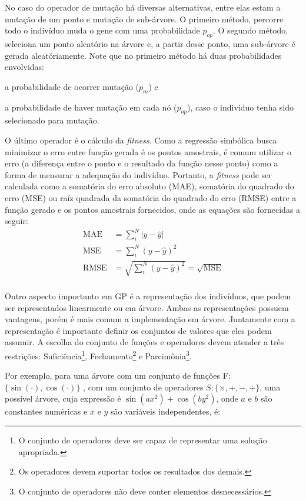 \documentclass[a4paper]{paper}
\begin{document}
No caso do operador de mutação há diversas alternativas, entre elas estam a
mutação de um ponto e mutação de sub-árvore. O primeiro método, percorre todo o
indivíduo muda o gene com uma probabilidade $p_{op}$. O segundo método, seleciona
um ponto aleatório na árvore e, a partir desse ponto, uma sub-árvore é gerada
aleatóriamente. Note que no primeiro método há duas probabilidades envolvidas:
\begin{ilist}
\item a probabilidade de ocorrer mutação ($p_m$) e
\item a probabilidade de haver mutação em cada nó ($p_{op}$), caso o indivíduo
  tenha sido selecionado para mutação.
\end{ilist}

O último operador é o cálculo da \textit{fitness}. Como a regressão simbólica
busca minimizar o erro entre função gerada é os pontos amostrais, é comum
utilizar o erro (a diferença entre o ponto e o resultado da função nesse ponto)
como a forma de mensurar a adequação do indivíduo. Portanto, a \textit{fitness}
pode ser calculada como a somatória do erro absoluto (MAE), somatória do
quadrado do erro (MSE) ou raíz quadrada da somatória do quadrado do erro (RMSE)
entre a função gerado e os pontos amostrais fornecidos, onde as equações são
fornecidas a seguir:
\begin{align*}
  \textrm{MAE} &= \sum_{i}^{N}|y-\hat{y}| \\
  \textrm{MSE} &= \sum_{i}^{N}(y-\hat{y})^2 \\
  \textrm{RMSE} &= \sqrt{\sum_{i}^{N}(y-\hat{y})^2} = \sqrt{\textrm{MSE}}\\
\end{align*}

Outro aspecto importanto em GP é a representação dos indivíduos, que podem ser
representados linearmente ou em árvore. Ambas as representações possuem
vantagens, porém é mais comum a implementação em árvore. Juntamente com a
representação é importante definir os conjuntos de valores que eles podem
assumir. A escolha do conjunto de funções e operadores devem atender a três
restrições: Suficiência\footnote{O conjunto de operadores deve ser capaz de
representar uma solução apropriada.}, Fechamento\footnote{Os operadores devem
suportar todos os resultados dos demais.} e Parcimônia\footnote{O conjunto de
operadores não deve conter elementos desnecessários.}.

Por exemplo, para uma árvore com um conjunto de funções F:
$\{\sin(\cdot),\cos(\cdot)\}$ , com um conjunto de operadores $S: \{\times, + ,
-, \div\}$, uma possível árvore, cuja expressão é $\sin(ax^2)+\cos(by^2)$, onde
$a$ e $b$ são constantes numéricas e $x$ e $y$ são variáveis independentes, é:
\end{document}
